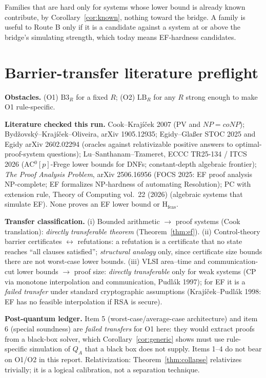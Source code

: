 \documentclass[11pt]{article}
\theoremstyle{definition}
\theoremstyle{remark}
\begin{document}
\noindent Families that are hard only for systems whose lower bound is already
known contribute, by Corollary~\ref{cor:known}, nothing toward the bridge.
A family is useful to Route B only if it is a candidate against a system at or
above the bridge's simulating strength, which today means EF-hardness
candidates.

\section{Barrier-transfer literature preflight}

\textbf{Obstacles.} (O1) $\mathrm{B3}_R$ for a fixed $R$; (O2)
$\mathrm{LB}_R$ for any $R$ strong enough to make O1 rule-specific.

\textbf{Literature checked this run.} Cook--Kraj\'i\v{c}ek 2007 (PV and
$NP=coNP$); Byd\v{z}ovsk\'y--Kraj\'i\v{c}ek--Oliveira, arXiv 1905.12935;
Egidy--Gla\ss{}er STOC 2025 and Egidy arXiv 2602.02294 (oracles against
relativizable positive answers to optimal-proof-system questions);
Lu--Santhanam--Tzameret, ECCC TR25-134 / ITCS 2026 (AC$^0[p]$-Frege lower
bounds for DNFs; constant-depth algebraic frontier);
\emph{The Proof Analysis Problem}, arXiv 2506.16956 (FOCS 2025: EF proof analysis
NP-complete; EF formalizes NP-hardness of automating Resolution);
PC with extension rule, Theory of Computing vol.~22 (2026) (algebraic systems that
simulate EF). None proves an EF lower bound or $\mathrm{H}_{\mathrm{feas}}$.

\textbf{Transfer classification.}
(i) Bounded arithmetic $\to$ proof systems (Cook translation): \emph{directly
transferable theorem} (Theorem~\ref{thm:ef}).
(ii) Control-theory barrier certificates $\leftrightarrow$ refutations: a
refutation is a certificate that no state reaches ``all clauses satisfied'';
\emph{structural analogy} only, since certificate size bounds there are not
worst-case lower bounds.
(iii) VLSI area--time and communication-cut lower bounds $\to$ proof size:
\emph{directly transferable} only for weak systems (CP via monotone
interpolation and communication, Pudl\'ak 1997); for EF it is a \emph{failed
transfer} under standard cryptographic assumptions (Kraj\'i\v{c}ek--Pudl\'ak 1998:
EF has no feasible interpolation if RSA is secure).

\textbf{Post-quantum ledger.} Item 5 (worst-case/average-case architecture) and
item 6 (special soundness) are \emph{failed transfers} for O1 here: they would
extract proofs from a black-box solver, which Corollary~\ref{cor:generic}
shows must use rule-specific simulation of $Q_A$ that a black box does not
supply. Items 1--4 do not bear on O1/O2 in this report.
Relativization: Theorem~\ref{thm:collapse} relativizes trivially; it is a
logical calibration, not a separation technique.
\end{document}
